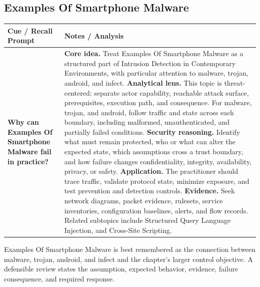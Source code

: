 \documentclass[11pt]{article}
\newcommand{\CornellHeader}{%
\rowcolor{Navy}\color{white}\bfseries Cue / Recall Prompt & \color{white}\bfseries Notes / Analysis\\\hline}
\newcommand{\CornellRow}[2]{%
\cellcolor{CueGray}\RaggedRight\textbf{#1} & \RaggedRight #2\\\hline}
\begin{document}
\subsection*{Examples Of Smartphone Malware}
\begin{longtable}{>{\RaggedRight\arraybackslash}p{}|>{\RaggedRight\arraybackslash}p{}}
\CornellHeader
\CornellRow{Why can Examples Of Smartphone Malware fail in practice?}{\textbf{Core idea.} Treat Examples Of Smartphone Malware as a structured part of Intrusion Detection in Contemporary Environments, with particular attention to malware, trojan, android, and infect. \textbf{Analytical lens.} This topic is threat-centered: separate actor capability, reachable attack surface, prerequisites, execution path, and consequence. For malware, trojan, and android, follow traffic and state across each boundary, including malformed, unauthenticated, and partially failed conditions. \textbf{Security reasoning.} Identify what must remain protected, who or what can alter the expected state, which assumptions cross a trust boundary, and how failure changes confidentiality, integrity, availability, privacy, or safety. \textbf{Application.} The practitioner should trace traffic, validate protocol state, minimize exposure, and test prevention and detection controls. \textbf{Evidence.} Seek network diagrams, packet evidence, rulesets, service inventories, configuration baselines, alerts, and flow records. Related subtopics include Structured Query Language Injection, and Cross-Site Scripting.}
\end{longtable}
\begin{topicsummary}
Examples Of Smartphone Malware is best remembered as the connection between malware, trojan, android, and infect and the chapter's larger control objective. A defensible review states the assumption, expected behavior, evidence, failure consequence, and required response.
\end{topicsummary}
\end{document}
